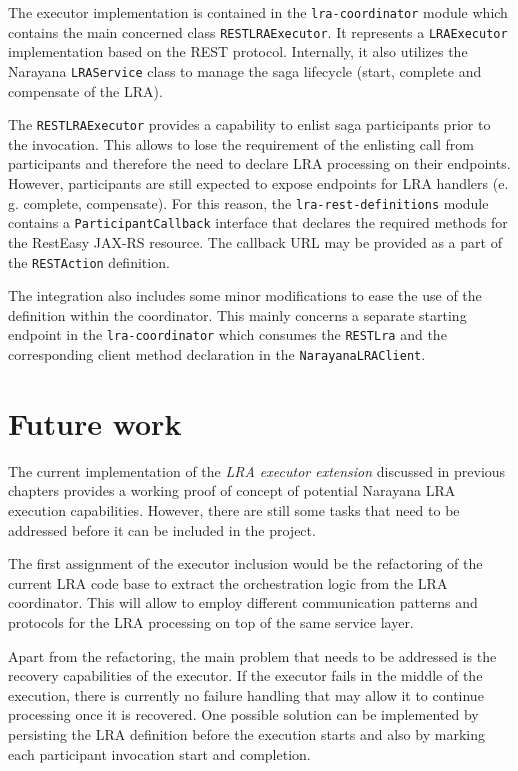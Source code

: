 \documentclass[oneside,
  digital, %
  table,   %
  lof,     %
  lot,     %
]{fithesis3}
\begin{document}
The executor implementation is contained in the \texttt{lra-coordinator} module which contains the main concerned class \texttt{RESTLRAExecutor}. It represents a \texttt{LRAExecutor} implementation based on the REST protocol. Internally, it also utilizes the Narayana \texttt{LRAService} class to manage the saga lifecycle (start, complete and compensate of the LRA).

The \texttt{RESTLRAExecutor} provides a capability to enlist saga participants prior to the invocation. This allows to lose the requirement of the enlisting call from participants and therefore the need to declare LRA processing on their endpoints. However, participants are still expected to expose endpoints for LRA handlers (e. g. complete, compensate). For this reason, the \texttt{lra-rest-definitions} module contains a \texttt{ParticipantCallback} interface that declares the required methods for the RestEasy JAX-RS resource. The callback URL may be provided as a part of the \texttt{RESTAction} definition.

The integration also includes some minor modifications to ease the use of the definition within the coordinator. This mainly concerns a separate starting endpoint in the \texttt{lra-coordinator} which consumes the \texttt{RESTLra} and the corresponding client method declaration in the \texttt{NarayanaLRAClient}.

\section{Future work}

The current implementation of the \textit{LRA executor extension} discussed in previous chapters provides a working proof of concept of potential Narayana LRA execution capabilities. However, there are still some tasks that need to be addressed before it can be included in the project.

The first assignment of the executor inclusion would be the refactoring of the current LRA code base to extract the orchestration logic from the LRA coordinator. This will allow to employ different communication patterns and protocols for the LRA processing on top of the same service layer. 

Apart from the refactoring, the main problem that needs to be addressed is the recovery capabilities of the executor. If the executor fails in the middle of the execution, there is currently no failure handling that may allow it to continue processing once it is recovered. One possible solution can be implemented by persisting the LRA definition before the execution starts and also by marking each participant invocation start and completion.
\end{document}
